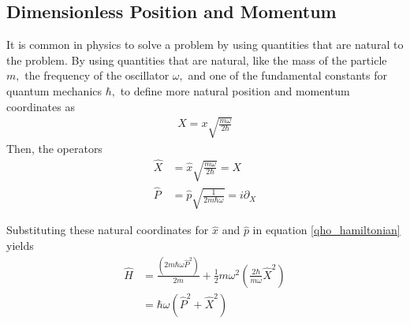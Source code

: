 \subsection{Dimensionless Position and Momentum}

It is common in physics to solve a problem by using quantities that are natural to the problem. By using quantities that are natural, like the mass of the particle \(m,\) the frequency of the oscillator \(\omega,\) and one of the fundamental constants for quantum mechanics \(\hbar,\) to define more natural position and momentum coordinates as
\begin{align}
    X=x\sqrt{\frac{m\omega}{2\hbar}}
\end{align}
Then, the operators
\begin{align}
    \hat X &= \hat x\sqrt{\frac{m\omega}{2\hbar}}=X\\
    \hat P &= \hat p\sqrt{\frac{1}{2m\hbar\omega}}=i\partial_X
\end{align}

Substituting these natural coordinates for \(\hat x\) and \(\hat p\) in equation \eqref{qho_hamiltonian} yields
\begin{align}
    \hat H&=\frac{\left(2m\hbar\omega\hat P^2\right)}{2m}+\frac{1}{2}m\omega^2 \left(\frac{2\hbar}{m\omega}\hat X^2\right)\\
    &=\hbar\omega\left(\hat P^2+\hat X^2\right)
\end{align}

